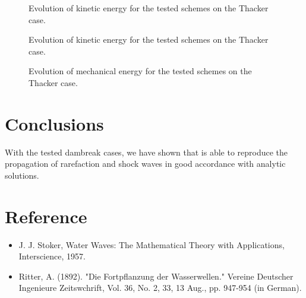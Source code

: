 \begin{figure}[H]
\centering
  \caption{Evolution of kinetic energy for the tested schemes on the Thacker case.}
\label{fig:stoker:Ep}
\end{figure}

\begin{figure}[H]
\centering
  \caption{Evolution of kinetic energy for the tested schemes on the Thacker case.}
\label{fig:stoker:Ec}
\end{figure}

\begin{figure}[H]
\centering
  \caption{Evolution of mechanical energy for the tested schemes on the Thacker case.}
\label{fig:stoker:Em}
\end{figure}

\section{ Conclusions}

With the tested dambreak cases, we have shown that  is able to reproduce the propagation
of rarefaction and shock waves in good accordance with analytic solutions. 

\section{Reference}

\begin{itemize}
\item J. J. Stoker, Water Waves: The Mathematical Theory with Applications, Interscience, 1957.
\item Ritter, A. (1892). "Die Fortpflanzung der Wasserwellen." Vereine Deutscher Ingenieure Zeitswchrift, Vol. 36, No. 2, 33, 
13 Aug., pp. 947-954 (in German).
\end{itemize}
